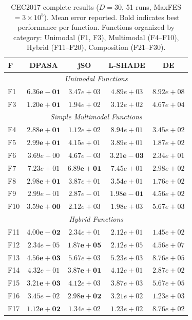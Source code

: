 \documentclass[11pt]{article}
\begin{document}
\begin{table}[!ht]
\centering
\caption{CEC2017 complete results ($D=30$, 51 runs, MaxFES $= 3 \times 10^5$). Mean error reported. Bold indicates best performance per function. Functions organized by category: Unimodal (F1, F3), Multimodal (F4--F10), Hybrid (F11--F20), Composition (F21--F30).}
\label{tab:cec_full}
\scriptsize
\begin{tabular}{@{}l|cc|cc@{}}
\toprule
\textbf{F} & \textbf{DPASA} & \textbf{jSO} & \textbf{L-SHADE} & \textbf{DE} \\
\midrule
\multicolumn{5}{c}{\textit{Unimodal Functions}} \\
\midrule
F1 & $\mathbf{6.36e-01}$ & $3.47e+03$ & $4.89e+03$ & $8.92e+08$ \\
F3 & $\mathbf{1.20e+01}$ & $1.94e+02$ & $3.12e+02$ & $4.67e+04$ \\
\midrule
\multicolumn{5}{c}{\textit{Simple Multimodal Functions}} \\
\midrule
F4 & $\mathbf{2.88e+01}$ & $1.12e+02$ & $8.94e+01$ & $3.45e+02$ \\
F5 & $\mathbf{2.99e+01}$ & $4.15e+01$ & $3.89e+01$ & $1.87e+02$ \\
F6 & $3.69e+00$ & $4.67e-03$ & $\mathbf{3.21e-03}$ & $2.34e+01$ \\
F7 & $7.23e+01$ & $\mathbf{6.89e+01}$ & $7.45e+01$ & $2.98e+02$ \\
F8 & $\mathbf{2.98e+01}$ & $3.87e+01$ & $3.54e+01$ & $1.76e+02$ \\
F9 & $2.99e-01$ & $2.87e-01$ & $\mathbf{1.98e-01}$ & $4.56e+02$ \\
F10 & $\mathbf{3.59e+00}$ & $2.12e+03$ & $1.98e+03$ & $5.67e+03$ \\
\midrule
\multicolumn{5}{c}{\textit{Hybrid Functions}} \\
\midrule
F11 & $\mathbf{4.00e-02}$ & $2.34e+01$ & $2.12e+01$ & $1.45e+02$ \\
F12 & $2.34e+05$ & $\mathbf{1.87e+05}$ & $2.12e+05$ & $4.56e+07$ \\
F13 & $\mathbf{4.56e+03}$ & $5.67e+03$ & $5.23e+03$ & $8.76e+05$ \\
F14 & $4.32e+01$ & $\mathbf{3.87e+01}$ & $4.12e+01$ & $2.87e+02$ \\
F15 & $\mathbf{3.21e+03}$ & $4.12e+03$ & $3.87e+03$ & $5.67e+05$ \\
F16 & $3.45e+02$ & $\mathbf{2.98e+02}$ & $3.21e+02$ & $1.23e+03$ \\
F17 & $\mathbf{1.12e+02}$ & $1.34e+02$ & $1.23e+02$ & $8.76e+02$ \\

\end{tabular}
\end{table}
\end{document}

